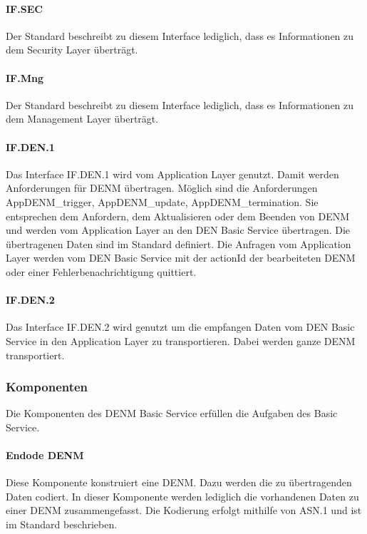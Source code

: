 \paragraph{IF.SEC}
Der Standard \cite{en302637-3} beschreibt zu diesem Interface lediglich, dass es Informationen zu dem Security Layer überträgt.  
\paragraph{IF.Mng}
Der Standard \cite{en302637-3} beschreibt zu diesem Interface lediglich, dass es Informationen zu dem Management Layer überträgt. 
\paragraph{IF.DEN.1}
Das Interface IF.DEN.1 wird vom Application Layer genutzt. Damit werden Anforderungen für \ac{DENM} übertragen. Möglich sind die Anforderungen AppDENM\_trigger, AppDENM\_update, AppDENM\_termination. Sie entsprechen dem Anfordern, dem Aktualisieren oder dem Beenden von \ac{DENM} und werden vom Application Layer an den \ac{DEN} Basic Service übertragen. Die übertragenen Daten sind im Standard \cite{en302637-3} definiert. Die Anfragen vom Application Layer werden vom \ac{DEN} Basic Service mit der actionId der bearbeiteten \ac{DENM} oder einer Fehlerbenachrichtigung quittiert.
\paragraph{IF.DEN.2}
Das Interface IF.DEN.2 wird genutzt um die empfangen Daten vom \ac{DEN} Basic Service in den Application Layer zu transportieren. Dabei werden ganze \ac{DENM} transportiert.


\subsubsection{Komponenten}
Die Komponenten des \ac{DENM} Basic Service erfüllen die Aufgaben des Basic Service.

\paragraph{Endode DENM \label{facilitylayer_EncodeDENM}}
Diese Komponente konstruiert eine \ac{DENM}. Dazu werden die zu übertragenden Daten codiert. In dieser Komponente werden lediglich die vorhandenen Daten zu einer \ac{DENM} zusammengefasst. Die Kodierung erfolgt mithilfe von \ac{ASN.1} und ist im Standard \cite{en302637-3} beschrieben. 

